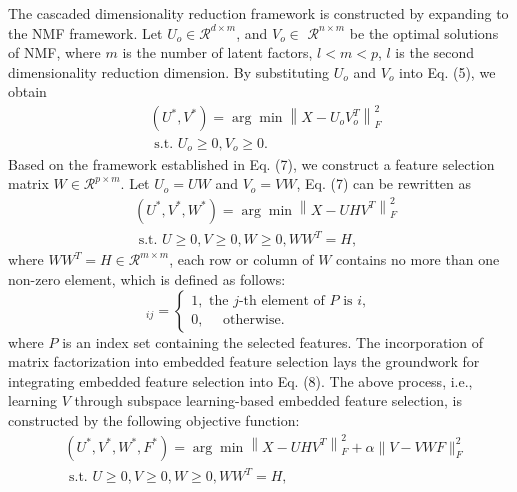 \documentclass[a4paper,fleqn]{cas-sc}
\begin{document}
The cascaded dimensionality reduction framework is constructed by expanding to the NMF framework. Let $ U_o \in \mathcal{R}^{d \times m}$, and $V_o \in$ $\mathcal{R}^{n \times m}$ be the optimal solutions of NMF, where $m$ is the number of latent factors, $l<m<p$, $l$ is the second dimensionality reduction dimension. By substituting $U_o$ and $V_o$ into Eq. (5), we obtain
\begin{equation}
	\begin{aligned}
		&\left(U^*, V^*\right)=\arg \min \left\|X-U_o V_o^T\right\|_F^2\\
		&\text { s.t. } U_o \geq 0, V_o \geq 0 \text {. }
	\end{aligned}
\end{equation}
Based on the framework established in Eq. (7), we construct a feature selection matrix  $W \in \mathcal{R}^{p \times m}$. Let $U_o=U W$ and $V_o=V W$, Eq. (7) can be rewritten as
\begin{equation}
	\begin{aligned}
		& \left(U^*, V^*, W^*\right)=\arg \min \left\|X-U H V^T\right\|_F^2 \\
		& \text { s.t. } U \geq 0, V \geq 0, W \geq 0, W W^T=H,
	\end{aligned}
\end{equation}
where $W W^T=H \in \mathcal{R}^{m \times m}$, each row or column of $W$ contains no more than one non-zero element, which is defined as follows:
\begin{equation}
	[W]_{i j}=\left\{\begin{array}{l}
		1, \text { the } j \text {-th element of } P \text { is } i, \\
		0, \quad \text { otherwise. }
	\end{array}\right.
\end{equation}
where $P$ is an index set containing the selected features. The incorporation of matrix factorization into embedded feature selection lays the groundwork for integrating embedded feature selection into Eq. (8). The above process, i.e., learning $V$ through subspace learning-based embedded feature selection, is constructed by the following objective function:
\begin{equation}
	\begin{aligned}
		& \left(U^*, V^*, W^*, F^*\right)=\arg \min \left\|X-U H V^T\right\|_F^2+\alpha\|V-V W F\|_F^2\\
		& \text { s.t. } U \geq 0, V \geq 0, W \geq 0, W W^T=H,
	\end{aligned}
\end{equation}
\end{document}
